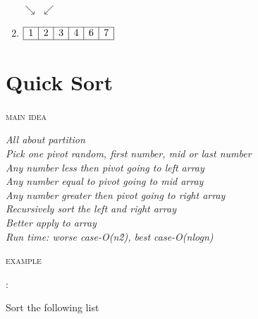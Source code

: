 \documentclass[12pt, letterpaper]{article}
\newcommand{\idea}[1]{
\noindent
\begin{minipage}[t]{0.15\textwidth}
	\textsc{main idea}
\end{minipage}
\hspace{-0.8cm}\vline\hspace{0.05cm}
\begin{minipage}[t]{0.88\textwidth}
	\textit{#1}
\end{minipage}\vspace{0.25cm}}
\newcommand{\example}[1]{
\noindent
\begin{minipage}[t]{0.02\textwidth}
	\textsc{example}
\end{minipage}
\hspace{1.6cm}:\hspace{0.05cm}
\begin{minipage}[t]{0.88\textwidth}
	\textnormal{#1}
\end{minipage}\vspace{0.25cm}}
\begin{document}
\begin{minipage}{0.8\textwidth}
\begin{enumerate}
		\hspace{0.8cm}$\searrow$
		\hspace{0.8cm}$\swarrow$
		\item
		$\begin{array}{|l|c|c|c|c|r|}
			\hline
			1 & 2 & 3 & 4 & 6 & 7 \\
			\hline
		\end{array}$
	\end{enumerate}
\end{minipage}

\newpage

\section{Quick Sort}
\idea{All about partition\\
	  Pick one pivot random, first number, mid or last number\\
	  Any number less then pivot going to left array\\
	  Any number equal to pivot going to mid array\\
	  Any number greater then pivot going to right array\\
	  Recursively sort the left and right array\\
	  Better apply to array\\
	  Run time: worse case-O(n\^{2}), best case-O(nlogn)}
\example{Sort the following list}
\end{document}

